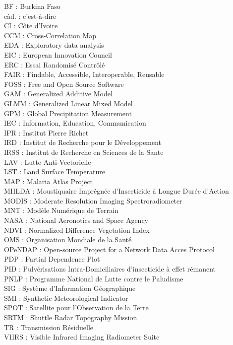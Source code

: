 \documentclass[12pt,twoside]{reedthesis}
\begin{document}
% 
  \listoffigures
  \begin{dedication}
    BF : Burkina Faso\\
    càd. : c'est-à-dire\\
    CI : Côte d'Ivoire\\
    CCM : Cross-Correlation Map\\
    EDA : Exploratory data analysis\\
    EIC : European Innovation Council\\
    ERC : Essai Randomisé Contrôlé\\
    FAIR : Findable, Accessible, Interoperable, Reusable\\
    FOSS : Free and Open Source Software\\
    GAM : Generalized Additive Model\\
    GLMM : Generalized Linear Mixed Model\\
    GPM : Global Precipitation Measurement\\
    IEC : Information, Education, Communication\\
    IPR : Institut Pierre Richet\\
    IRD : Institut de Recherche pour le Développement\\
    IRSS : Institut de Recherche en Sciences de la Sante\\
    LAV : Lutte Anti-Vectorielle\\
    LST : Land Surface Temperature\\
    MAP : Malaria Atlas Project\\
    MIILDA : Moustiquaire Imprégnée d'Insecticide à Longue Durée d'Action\\
    MODIS : Moderate Resolution Imaging Spectroradiometer\\
    MNT : Modèle Numérique de Terrain\\
    NASA : National Aeronotics and Space Agency\\
    NDVI : Normalized Difference Vegetation Index\\
    OMS : Organisation Mondiale de la Santé\\
    OPeNDAP : Open-source Project for a Network Data Acces Protocol\\
    PDP : Partial Dependence Plot\\
    PID : Pulvérisations Intra-Domiciliaires d'insecticide à effet rémanent\\
    PNLP : Programme National de Lutte contre le Paludisme\\
    SIG : Système d'Information Géographique\\
    SMI : Synthetic Meteorological Indicator\\
    SPOT : Satellite pour l'Observation de la Terre\\
    SRTM : Shuttle Radar Topography Mission\\
    TR : Transmission Résiduelle\\
    VIIRS : Visible Infrared Imaging Radiometer Suite
  \end{dedication}
\end{document}
